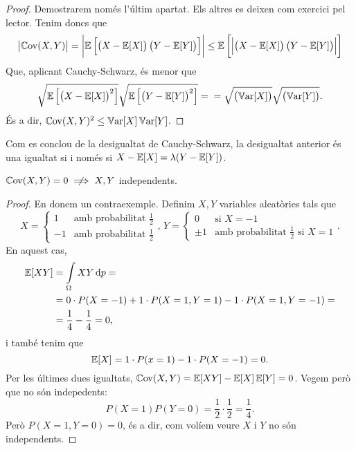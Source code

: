 \begin{proof}
    Demostrarem nom\'es l'últim apartat. Els altres es deixen com exercici pel lector.
    Tenim doncs que
    \[
        \left|\operatorname{\mathbb{C}ov}(X, Y)\right| = 
        \left|\operatorname{\mathbb{E}}\left[\left( X - \operatorname{\mathbb{E}}[X] \right) \left( Y- \operatorname{\mathbb{E}}[Y]\right)\right]\right| 
        \leq \operatorname{\mathbb{E}}\left[\left|\left( X - \operatorname{\mathbb{E}}[X] \right) \left( Y- \operatorname{\mathbb{E}}[Y]\right)\right|\right]
    \]
    Que, aplicant Cauchy-Schwarz, \'es menor que
    \[
        \sqrt{\operatorname{\mathbb{E}} \left[ \left( X - \operatorname{\mathbb{E}}[X] \right)^2\right]} 
        \sqrt{\operatorname{\mathbb{E}} \left[ \left( Y - \operatorname{\mathbb{E}}[Y] \right)^2\right]} = \\
        = \sqrt{\left(\operatorname{\mathbb{V}ar}[X]\right)} \sqrt{\left( \operatorname{\mathbb{V}ar}[Y] \right)}.
    \]
    \'Es a dir, $\operatorname{\mathbb{C}ov}(X, Y)^2 \leq \operatorname{\mathbb{V}ar}[X] \operatorname{\mathbb{V}ar}[Y]$.
\end{proof}

\begin{obs}
    Com es conclou de la desigualtat de Cauchy-Schwarz, la desigualtat anterior \'es una
    igualtat si i nom\'es si $X - \operatorname{\mathbb{E}}[X] = \lambda (Y - \operatorname{\mathbb{E}}[Y])$.
\end{obs}

\begin{obs}
    $\cov(X, Y) = 0 \centernot \implies X,Y$ independents.
\end{obs}

\begin{proof}
    En donem un contraexemple. Definim $X, Y$ variables aleatòries tals que
    \[
        X = 
        \begin{cases}
            1 &\text{amb probabilitat } \frac{1}{2}\\
            -1 &\text{amb probabilitat } \frac{1}{2} 
        \end{cases}, \,
        Y =
        \begin{cases}
            0 &\text{si } X = -1 \\
            \pm 1 &\text{amb probabilitat } \frac{1}{2} \text{ si } X = 1
        \end{cases}.
    \]
    En aquest cas,
    \begin{align*}
        \esp[XY] &= \int\limits_{\Omega} XY \dif p = \\
        &= 0 \cdot P(X = -1) + 1 \cdot 
        P(X = 1, Y = 1) - 1 \cdot P(X= 1, Y= -1) = \\
        &= \frac{1}{4} - \frac{1}{4} = 0,
    \end{align*}
    i tamb\'e tenim que
    \[
        \operatorname{\mathbb{E}}[X] = 1\cdot P(x = 1) - 1 \cdot P(X = -1) = 0. 
    \]
    Per les últimes dues igualtats, $\operatorname{\mathbb{C}ov}(X, Y) = \operatorname{\mathbb{E}}[XY] - \operatorname{\mathbb{E}}[X]\operatorname{\mathbb{E}}[Y] = 0$. Vegem
    però que no són indepedents:
    \[
        P(X = 1)P(Y = 0) = \frac{1}{2} \cdot \frac{1}{2} = \frac{1}{4}.
    \]
    Però $P(X = 1, Y = 0) = 0$, \'es a dir, com volíem veure $X$ i $Y$ no són independents.
\end{proof}


